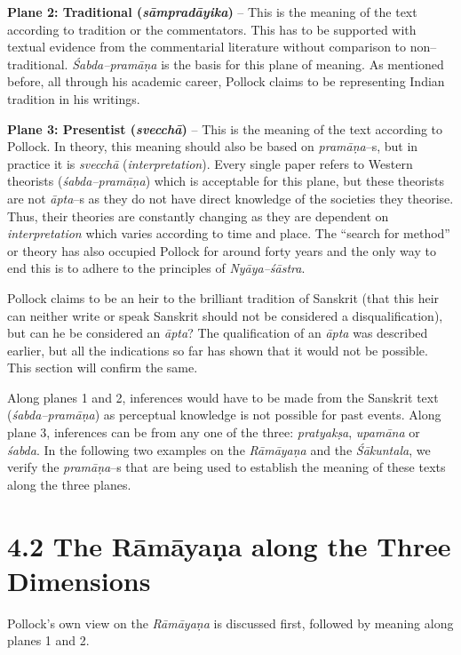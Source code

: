\textbf{Plane 2: Traditional (\textit{sāmpradāyika})} – This is the meaning of the text according to tradition or the commentators. This has to be supported with textual evidence from the commentarial literature without comparison to non–traditional. \textit{Śabda–pramāṇa} is the basis for this plane of meaning. As mentioned before, all through his academic career, Pollock claims to be representing Indian tradition in his writings.

\textbf{Plane 3: Presentist (\textit{svecchā})} – This is the meaning of the text according to Pollock. In theory, this meaning should also be based on \textit{pramāṇa}–s, but in practice it is \textit{svecchā} (\textit{interpretation}). Every single paper refers to Western theorists (\textit{śabda–pramāṇa}) which is acceptable for this plane, but these theorists are not \textit{āpta}–s as they do not have direct knowledge of the societies they theorise. Thus, their theories are constantly changing as they are dependent on \textit{interpretation} which varies according to time and place. The “search for method” or theory has also occupied Pollock for around forty years and the only way to end this is to adhere to the principles of \textit{Nyāya–śāstra}.

Pollock claims to be an heir to the brilliant tradition of Sanskrit (that this heir can neither write or speak Sanskrit should not be considered a disqualification), but can he be considered an \textit{āpta}? The qualification of an \textit{āpta} was described earlier, but all the indications so far has shown that it would not be possible. This section will confirm the same.

Along planes 1 and 2, inferences would have to be made from the Sanskrit text (\textit{śabda–pramāṇa}) as perceptual knowledge is not possible for past events. Along plane 3, inferences can be from any one of the three: \textit{pratyakṣa}, \textit{upamāna }or \textit{śabda}. In the following two examples on the \textit{Rāmāyaṇa }and the \textit{Śākuntala}, we verify the \textit{pramāṇa}–s that are being used to establish the meaning of these texts along the three planes.

\vspace{-.2cm}

\section*{4.2 The Rāmāyaṇa along the Three Dimensions}

Pollock’s own view on the \textit{Rāmāyaṇa} is discussed first, followed by meaning along planes 1 and 2.

